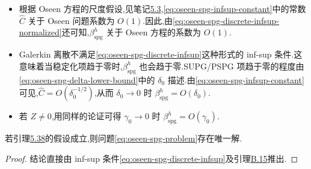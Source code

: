 \begin{note}\label{note:oseen-spg-infsup-constant}
\begin{itemize}
  \item 根据 Oseen 方程的尺度假设,见笔记\hyperref[note:oseen-coefficients]{5.3},\cref{eq:oseen-spg-infsup-constant}中的常数 $\widehat C$ 关于 Oseen 问题系数为 $O(1)$.因此,由\cref{eq:oseen-spg-discrete-infsup-normalized}还可知,$\beta_{\mathrm{spg}}^h$ 关于 Oseen 方程的系数为 $O(1)$.
  \item Galerkin 离散不满足\cref{eq:oseen-spg-discrete-infsup}这种形式的 inf-sup 条件.这意味着当稳定化项趋于零时,$\beta_{\mathrm{spg}}^h$ 也会趋于零.SUPG/PSPG 项趋于零的程度由\cref{eq:oseen-spg-delta-lower-bound}中的 $\delta_0$ 描述.由\cref{eq:oseen-spg-infsup-constant}可见,$\widehat C=O(\delta_0^{-1/2})$,从而 $\delta_0\to0$ 时 $\beta_{\mathrm{spg}}^h=O(\delta_0)$.
  \item 若 $Z\ne0$,用同样的论证可得 $\gamma_0\to0$ 时 $\beta_{\mathrm{spg}}^h=O(\gamma_0)$.
\end{itemize}
\end{note}

\begin{corollary}[问题(5.33)解的存在唯一性]\label{cor:oseen-spg-existence-uniqueness}
若引理\hyperref[lem:oseen-spg-discrete-infsup]{5.38}的假设成立,则问题\cref{eq:oseen-spg-problem}存在唯一解.
\end{corollary}
\begin{proof}
结论直接由 inf-sup 条件\cref{eq:oseen-spg-discrete-infsup}及引理\hyperref[lem:appendix-b-15]{B.15}推出.
\end{proof}

